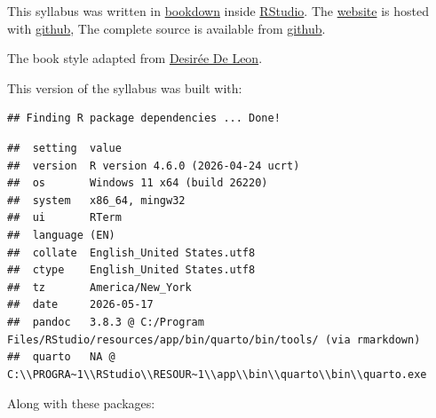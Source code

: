\documentclass[
]{book}
\begin{document}
This syllabus was written in \href{http://bookdown.org/}{bookdown} inside \href{http://www.rstudio.com/ide/}{RStudio}. The \href{https://smasongarrison.github.io/syllabi}{website} is hosted with \href{https://www.github.com}{github}, The complete source is available from \href{https://github.com/smasongarrison/syllabi}{github}.

The book style adapted from \href{https://desiree.rbind.io/}{Desirée De Leon}.

This version of the syllabus was built with:

\begin{verbatim}
## Finding R package dependencies ... Done!
\end{verbatim}

\begin{verbatim}
##  setting  value
##  version  R version 4.6.0 (2026-04-24 ucrt)
##  os       Windows 11 x64 (build 26220)
##  system   x86_64, mingw32
##  ui       RTerm
##  language (EN)
##  collate  English_United States.utf8
##  ctype    English_United States.utf8
##  tz       America/New_York
##  date     2026-05-17
##  pandoc   3.8.3 @ C:/Program Files/RStudio/resources/app/bin/quarto/bin/tools/ (via rmarkdown)
##  quarto   NA @ C:\\PROGRA~1\\RStudio\\RESOUR~1\\app\\bin\\quarto\\bin\\quarto.exe
\end{verbatim}

Along with these packages:
\end{document}
